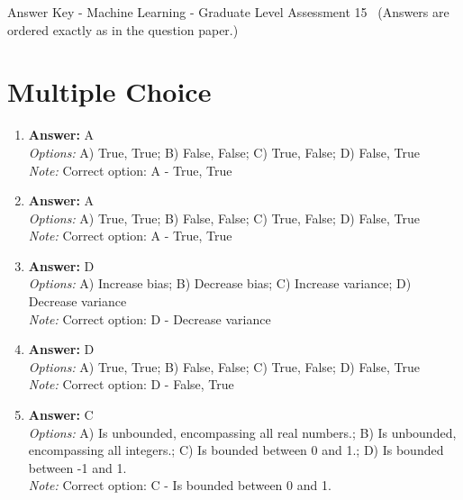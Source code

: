 \documentclass[12pt]{article}
\begin{document}
\begin{center}
Answer Key - Machine Learning - Graduate Level Assessment 15 \
\small (Answers are ordered exactly as in the question paper.)
\end{center}

\section*{Multiple Choice}
\begin{enumerate}[label=\arabic*.]
\item \textbf{Answer:} A
\\ \textit{Options:} A) True, True; B) False, False; C) True, False; D) False, True
\\ \textit{Note:} Correct option: A - True, True
\item \textbf{Answer:} A
\\ \textit{Options:} A) True, True; B) False, False; C) True, False; D) False, True
\\ \textit{Note:} Correct option: A - True, True
\item \textbf{Answer:} D
\\ \textit{Options:} A) Increase bias; B) Decrease bias; C) Increase variance; D) Decrease variance
\\ \textit{Note:} Correct option: D - Decrease variance
\item \textbf{Answer:} D
\\ \textit{Options:} A) True, True; B) False, False; C) True, False; D) False, True
\\ \textit{Note:} Correct option: D - False, True
\item \textbf{Answer:} C
\\ \textit{Options:} A) Is unbounded, encompassing all real numbers.; B) Is unbounded, encompassing all integers.; C) Is bounded between 0 and 1.; D) Is bounded between -1 and 1.
\\ \textit{Note:} Correct option: C - Is bounded between 0 and 1.
\end{enumerate}
\end{document}
